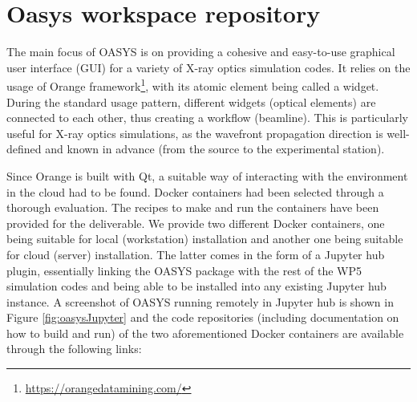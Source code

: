 \documentclass[10pt]{scrartcl}
\begin{document}
\section{Oasys workspace repository}
\label{sec:oasys}
The main focus of OASYS is on providing a cohesive and easy-to-use graphical user interface (GUI) for a variety of X-ray optics simulation codes. It relies on the usage of Orange framework\footnote{\url{https://orangedatamining.com/}}, with its atomic element being called a widget. During the standard usage pattern, different widgets (optical elements) are connected to each other, thus creating a workflow (beamline). This is particularly useful for X-ray optics simulations, as the wavefront propagation direction is well-defined and known in advance (from the source to the experimental station).

Since Orange is built with Qt, a suitable way of interacting with the environment in the cloud had to be found. Docker containers had been selected through a thorough evaluation. The recipes to make and run the containers have been provided for the deliverable. We provide two different Docker containers, one being suitable for local (workstation) installation and another one being suitable for cloud (server) installation. The latter comes in the form of a Jupyter hub plugin, essentially linking the OASYS package with the rest of the WP5 simulation codes and being able to be installed into any existing Jupyter hub instance.  A screenshot of OASYS running remotely in Jupyter hub is shown in Figure \ref{fig:oasysJupyter} and the code repositories (including documentation on how to build and run) of the two aforementioned Docker containers are available through the following links:
\end{document}

